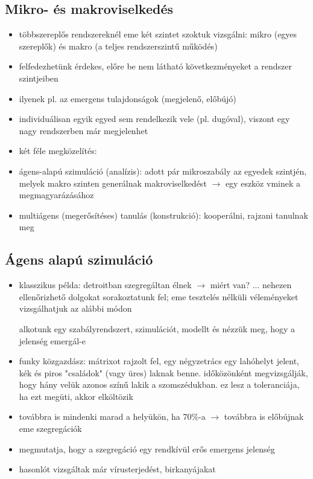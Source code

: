 \documentclass[a4paper, 11pt]{article}
\begin{document}
\subsection{Mikro- és makroviselkedés}

\begin{itemize}
	\item többszereplős rendszereknél eme két szintet szoktuk vizsgálni: mikro (egyes szereplők) és makro (a teljes rendszerszintű működés)
	\item felfedezhetünk érdekes, előre be nem látható következményeket a rendszer szintjeiben
	\item ilyenek pl. az emergens tulajdonságok (megjelenő, előbújó)
	\item individuálisan egyik egyed sem rendelkezik vele (pl. dugóval), viszont egy nagy rendszerben már megjelenhet
	\item két féle megközelítés:
	\item ágens-alapú szimuláció (analízis): adott pár mikroszabály az egyedek szintjén, melyek makro szinten generálnak makroviselkedést $\to$ egy eszköz vminek a megmagyarázásához
	\item multiágens (megerősítéses) tanulás (konstrukció): kooperálni, rajzani tanulnak meg
\end{itemize}

\subsection{Ágens alapú szimuláció}

\begin{itemize}
	\item klasszikus példa: detroitban szegregáltan élnek $\to$ miért van? ... nehezen ellenőrizhető dolgokat sorakoztatunk fel; eme tesztelés nélküli véleményeket vizsgálhatjuk az alábbi módon
	\begin{center}
		alkotunk egy szabályrendszert, szimulációt, modellt és nézzük meg, hogy a jelenség emergál-e
	\end{center}
	\item funky közgazdász: mátrixot rajzolt fel, egy négyzetrács egy lahóhelyt jelent, kék és piros "családok" (vagy üres) laknak benne. időközönként megvizsgálják, hogy hány velük azonos színű lakik a szomszédukban. ez lesz a toleranciája, ha ezt megüti, akkor elköltözik
	\item továbbra is mindenki marad a helyükön, ha 70\%-a $\to$ továbbra is előbújnak eme szegregációk
	\item megmutatja, hogy a szegregáció egy rendkívül erős emergens jelenség
	\item hasonlót vizsgáltak már vírusterjedést, birkanyájakat	
\end{itemize}
\end{document}
